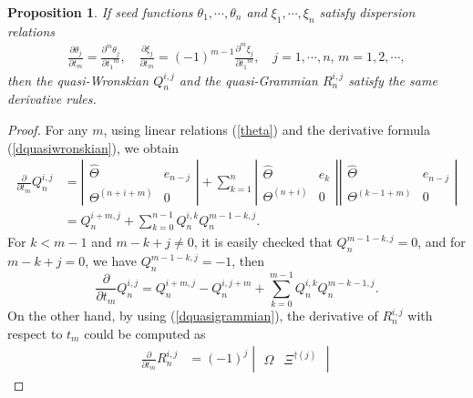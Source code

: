 \documentclass[11p,reqno]{amsart}
\numberwithin{equation}{section}
\newtheorem{proposition}[theorem]{Proposition}
\numberwithin{equation}{section}
\begin{document}
\begin{proposition}\label{prop1}
If seed functions $\theta_1,\cdots,\theta_n$ and $\xi_1,\cdots,\xi_n$ satisfy dispersion relations
\begin{align}\label{theta}
 \frac{\partial \theta_j}{\partial t_m} = \frac{\partial^m \theta_j}{\partial {t_1}^m},\quad \frac{\partial \xi_j}{\partial{t_m}}=(-1)^{m-1} \frac{\partial^m \xi_j}{\partial {t_1}^m},
 \quad j=1,\cdots,n,\,m=1,2,\cdots,
\end{align}
then the quasi-Wronskian $Q_n^{i, j}$ and the quasi-Grammian $R_n^{i, j}$ satisfy the same derivative rules.
\end{proposition}
\begin{proof}
For any $m$, using linear relations (\ref{theta}) and the derivative formula (\ref{dquasiwronskian}), we obtain
\begin{align*}
    \frac{\partial}{\partial t_m} Q_n^{i, j} 
    &= \left| \begin{array}{cc}
    \widehat{\Theta} & e_{n-j} \\
    \Theta^{(n+i+m)} & \boxed{0}
    \end{array} \right| 
    + \sum_{k=1}^{n} 
    \left| \begin{array}{cc}
    \widehat{\Theta} & e_k \\
    \Theta^{(n+i)} & \boxed{0}
    \end{array} \right|
    \left| \begin{array}{cc}
    \widehat{\Theta} & e_{n-j} \\
    \Theta^{(k-1+m)} & \boxed{0}
    \end{array} \right| \\
    &= Q_n^{i + m, j} + \sum_{k=0}^{n-1} Q_n^{i,k} Q_n^{m-1-k,j}.
\end{align*}
For $k<m-1$ and $m-k+j\neq0$, it is easily checked that $Q_n^{m-1-k,j}=0$, and for $m-k+j=0$, we have 
$Q_n^{m-1-k,j}=-1$, then 
\begin{equation}\label{deri_quasi}
    \frac{\partial}{\partial t_m} Q_n^{i, j} = Q_n^{i + m, j} - Q_n^{i, j + m} + \sum_{k=0}^{m-1} Q_n^{i, k} Q_n^{m - k - 1, j}.
\end{equation}
On the other hand, by using (\ref{dquasigrammian}), the derivative of $R_n^{i, j}$ with respect to $t_m$ could be computed as
\begin{equation}
    \begin{split}
    \frac{\partial}{\partial t_m} R_n^{i, j} &= (-1)^j \begin{vmatrix}
        \Omega & \Xi^{\dagger(j)} \\

\end{vmatrix}
\end{split}
\end{equation}
\end{proof}
\end{document}

